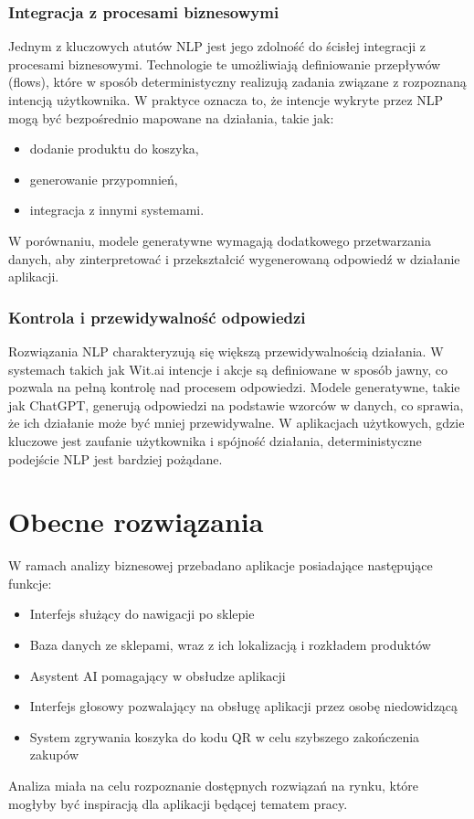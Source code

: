 \subsubsection{Integracja z procesami biznesowymi}

Jednym z kluczowych atutów NLP jest jego zdolność do ścisłej integracji z procesami biznesowymi. Technologie te umożliwiają definiowanie przepływów (flows), które w sposób deterministyczny realizują zadania związane z rozpoznaną intencją użytkownika. W praktyce oznacza to, że intencje wykryte przez NLP mogą być bezpośrednio mapowane na działania, takie jak:

\begin{itemize}
    \item dodanie produktu do koszyka,
    \item generowanie przypomnień,
    \item integracja z innymi systemami.
\end{itemize}
W porównaniu, modele generatywne wymagają dodatkowego przetwarzania danych, aby zinterpretować i przekształcić wygenerowaną odpowiedź w działanie aplikacji.

\subsubsection{Kontrola i przewidywalność odpowiedzi}

Rozwiązania NLP charakteryzują się większą przewidywalnością działania. W systemach takich jak Wit.ai intencje i akcje są definiowane w sposób jawny, co pozwala na pełną kontrolę nad procesem odpowiedzi. Modele generatywne, takie jak ChatGPT, generują odpowiedzi na podstawie wzorców w danych, co sprawia, że ich działanie może być mniej przewidywalne. W aplikacjach użytkowych, gdzie kluczowe jest zaufanie użytkownika i spójność działania, deterministyczne podejście NLP jest bardziej pożądane.

\section{Obecne rozwiązania}
\label{subsec:obecne_rozwiazania}

W ramach analizy biznesowej przebadano aplikacje posiadające następujące funkcje:

\begin{itemize}
    \item Interfejs służący do nawigacji po sklepie
    \item Baza danych ze sklepami, wraz z ich lokalizacją i rozkładem produktów
    \item Asystent AI pomagający w obsłudze aplikacji
    \item Interfejs głosowy pozwalający na obsługę aplikacji przez osobę niedowidzącą
    \item System zgrywania koszyka do kodu QR w celu szybszego zakończenia zakupów
\end{itemize}
Analiza miała na celu rozpoznanie dostępnych rozwiązań na rynku, które mogłyby być inspiracją dla aplikacji będącej tematem pracy.


